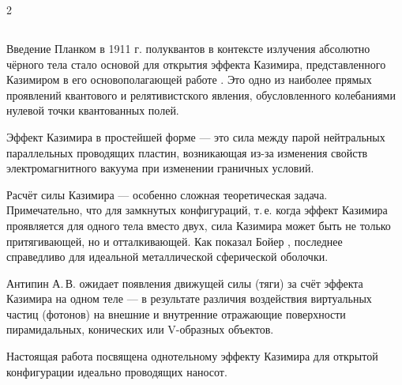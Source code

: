 \documentclass[twoside, 10pt]{article}
\def\myvspacebeforesubsection{-2.0mm}
\def\myvspaceaftersubsection{-2.5mm}
\begin{document}
\begin{multicols}{2}

\vspace{\myvspacebeforesubsection}
    \subsection*{}\label{introduction}
\vspace{\myvspaceaftersubsection}

Введение Планком в 1911 г. полуквантов в контексте излучения
абсолютно чёрного тела стало основой для открытия эффекта Казимира,
представленного Казимиром в его основополагающей работе \cite{Casimir1948}.
Это одно из наиболее прямых проявлений квантового и релятивистского явления,
обусловленного колебаниями нулевой точки квантованных полей.

Эффект Казимира в простейшей форме — это сила между парой
нейтральных параллельных проводящих пластин, возникающая из-за изменения
свойств электромагнитного вакуума при изменении граничных условий.

Расчёт силы Казимира — особенно сложная
теоретическая задача. Примечательно, что для замкнутых конфигураций, т.\,е. когда
эффект Казимира проявляется для одного тела вместо двух, сила Казимира может быть
не только притягивающей, но и отталкивающей. Как показал Бойер
\cite{Boyer1968}, последнее справедливо для идеальной металлической сферической оболочки.

Антипин А.\,В. \cite{Antipin2012} ожидает появления движущей силы (тяги) за счёт эффекта Казимира
на одном теле — в результате различия воздействия виртуальных частиц (фотонов) на
внешние и внутренние отражающие поверхности пирамидальных, конических или \mbox{V-образных} объектов.

Настоящая работа посвящена однотельному эффекту Казимира для открытой
конфигурации идеально проводящих наносот.




\end{multicols}
\end{document}
